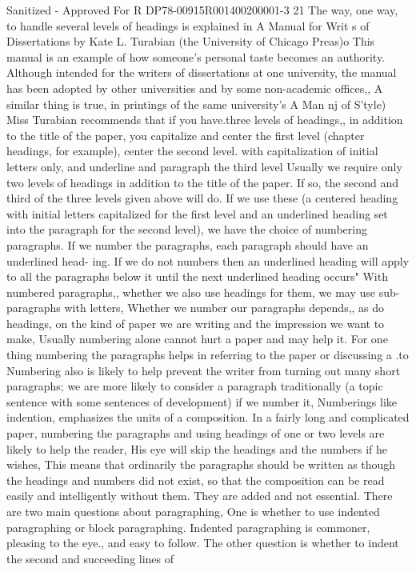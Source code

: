 \documentclass[
    oneside,
    11pt,
    draft
]{memoir}
\begin{document}
Sanitized - Approved For R DP78-00915R001400200001-3 21 The way, one way, to handle several levels of headings is explained in A Manual for Writ s of Dissertations by Kate L. Turabian (the University of Chicago Preas)o This manual is an example of how someone's personal taste becomes an authority. Although intended for the writers of dissertations at one university, the manual has been adopted by other universities and by some non-academic offices,, A similar thing is true, in printings of the same university's A Man nj of S'tyle) Miss Turabian recommends that if you have.three levels of headings,, in addition to the title of the paper, you capitalize and center the first level (chapter headings, for example), center the second level. with capitalization of initial letters only, and underline and paragraph the third level Usually we require only two levels of headings in addition to the title of the paper. If so, the second and third of the three levels given above will do. If we use these (a centered heading with initial letters capitalized for the first level and an underlined heading set into the paragraph for the second level), we have the choice of numbering paragraphs. If we number the paragraphs, each paragraph should have an underlined head- ing. If we do not numbers then an underlined heading will apply to all the paragraphs below it until the next underlined heading occurs" With numbered paragraphs,, whether we also use headings for them, we may use sub-paragraphs with letters, Whether we number our paragraphs depends,, as do headings, on the kind of paper we are writing and the impression we want to make, Usually numbering alone cannot hurt a paper and may help it. For one thing numbering the paragraphs helps in referring to the paper or discussing a .to Numbering also is likely to help prevent the writer from turning out many short paragraphs; we are more likely to consider a paragraph traditionally (a topic sentence with some sentences of development) if we number it, Numberings like indention, emphasizes the units of a composition. In a fairly long and complicated paper, numbering the paragraphs and using headings of one or two levels are likely to help the reader, His eye will skip the headings and the numbers if he wishes, This means that ordinarily the paragraphs should be written as though the headings and numbers did not exist, so that the composition can be read easily and intelligently without them. They are added and not essential. There are two main questions about paragraphing, One is whether to use indented paragraphing or block paragraphing. Indented paragraphing is commoner, pleasing to the eye., and easy to follow. The other question is whether to indent the second and succeeding lines of
\end{document}
